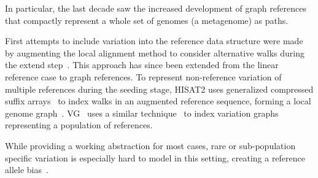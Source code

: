 In particular, the last decade saw the increased development of graph references
that compactly represent a whole set of genomes (a metagenome) as paths.

First attempts to include variation into the reference data structure were made
by augmenting the local alignment method to consider alternative walks during the
extend step~\cite{schneeberger_simultaneous_2009,palmapper}. This approach has
since been extended from the linear reference case to graph references. To
represent non-reference variation of multiple references during the seeding
stage, HISAT2 uses generalized compressed suffix
arrays~\cite{siren_indexing_2014} to index walks in an augmented reference
sequence, forming a local genome graph~\cite{kim_graphbased_2019}.
VG~\cite{garrison_variation_2018} uses a similar
technique~\cite{siren_indexing_2017} to index variation graphs representing a
population of references.

While providing a working abstraction for most cases, rare or sub-population
specific variation is especially hard to model in this setting, creating a
reference allele bias~\cite{stevenson_sources_2013,brandt_mapping_2015}.
